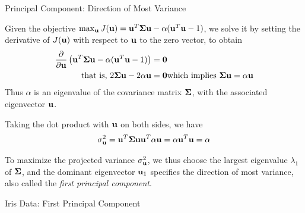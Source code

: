 \begin{frame}{Principal Component: Direction of Most Variance}

  Given the objective $\max_{\mathbf{u}} J(\mathbf{u}) =  
  \mathbf{u}^T {\bm \Sigma} \mathbf{u} - \alpha (\mathbf{u}^T\mathbf{u}-1)$, we solve it by
setting the derivative of $J(\mathbf{u})$
with respect to $\mathbf{u}$ to the zero vector, to obtain
\begin{align*}
  \frac{\partial}{\partial \mathbf{u}} \left(\mathbf{u}^T {\bm \Sigma} \mathbf{u} - \alpha
  (\mathbf{u}^T\mathbf{u}-1)\right) & = \mathbf{0}\\
  \text{that is, }2 {\bm \Sigma} \mathbf{u} - 2 \alpha \mathbf{u}  &= \mathbf{0}
  \text{which implies } {\bm \Sigma} \mathbf{u}  = \alpha \mathbf{u}
\end{align*}
Thus $\alpha$ is an eigenvalue of the covariance matrix
${\bm \Sigma}$, with the associated eigenvector $\mathbf{u}$.

\medskip
Taking the dot product with $\mathbf{u}$ on both sides, we have
\begin{align*}
\sigma^2_{\mathbf{u}}  = \mathbf{u}^T{\bm \Sigma}\mathbf{u}  \mathbf{u}^T \alpha \mathbf{u} = 
\alpha \mathbf{u}^T\mathbf{u} =  \alpha
\end{align*}

\medskip
To maximize the projected variance $\sigma_{\mathbf{u}}^2$,
we thus choose the largest eigenvalue $\lambda_1$ of ${\bm \Sigma}$, and
the dominant eigenvector $\mathbf{u}_1$ specif\/{i}es the
direction of most variance, also called the
{\em f\/{i}rst principal
component}.
\end{frame}


\begin{frame}{Iris Data: First Principal Component}
  \centerline{
}
\end{frame}



